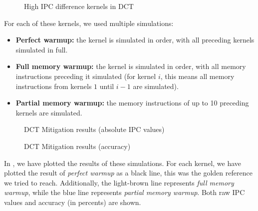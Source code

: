 \begin{figure}
    \centering
    \caption{High IPC difference kernels in DCT}
    \label{fig:dct_kernels}
\end{figure}

For each of these kernels, we used multiple simulations:
\begin{itemize}
    \item \textbf{Perfect warmup:} the kernel is simulated in order, with all preceding kernels simulated in full.
    \item \textbf{Full memory warmup:} the kernel is simulated in order, with all memory instructions preceding it simulated (for kernel $i$, this means all memory instructions from kernels $1$ until $i - 1$ are simulated).
    \item \textbf{Partial memory warmup:} the memory instructions of up to 10 preceding kernels are simulated.
\end{itemize}

\begin{figure}[t]
    \centering
    \caption{DCT Mitigation results (absolute IPC values)}
    \label{fig:mitig_abs}
\end{figure}

\begin{figure}[t]
    \centering
    \caption{DCT Mitigation results (accuracy)}
    \label{fig:mitig_acc}
\end{figure}

In , we have plotted the results of these simulations.
For each kernel, we have plotted the result of \textit{perfect warmup} as a black line, this was the golden reference we tried to reach.
Additionally, the light-brown line represents \textit{full memory warmup}, while the blue line represents \textit{partial memory warmup}.
Both raw IPC values and accuracy (in percents) are shown.

